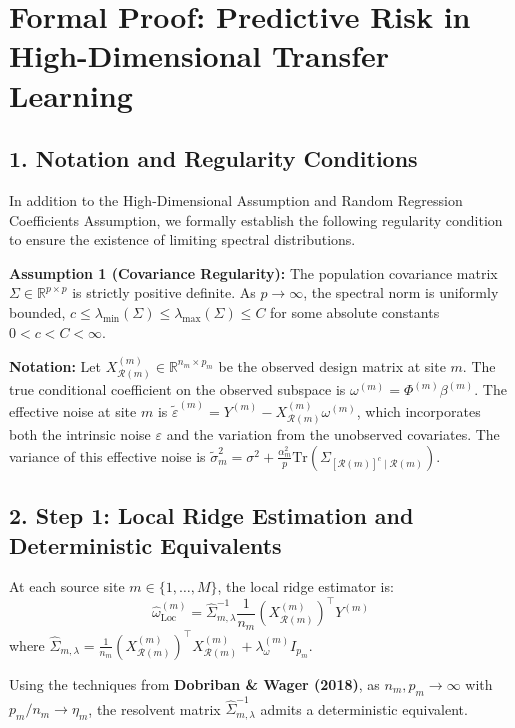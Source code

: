 \documentclass{article}
\begin{document}
\section*{Formal Proof: Predictive Risk in High-Dimensional Transfer Learning}

\subsection*{1. Notation and Regularity Conditions}

In addition to the High-Dimensional Assumption and Random Regression Coefficients Assumption, we formally establish the following regularity condition to ensure the existence of limiting spectral distributions.

\textbf{Assumption 1 (Covariance Regularity):} The population covariance matrix $\Sigma \in \mathbb{R}^{p \times p}$ is strictly positive definite. As $p \to \infty$, the spectral norm is uniformly bounded, $c \le \lambda_{\min}(\Sigma) \le \lambda_{\max}(\Sigma) \le C$ for some absolute constants $0 < c < C < \infty$.

\textbf{Notation:} Let $X_{\mathcal{R}(m)}^{(m)} \in \mathbb{R}^{n_m \times p_m}$ be the observed design matrix at site $m$. The true conditional coefficient on the observed subspace is $\omega^{(m)} = \Phi^{(m)} \beta^{(m)}$. The effective noise at site $m$ is $\tilde{\varepsilon}^{(m)} = Y^{(m)} - X_{\mathcal{R}(m)}^{(m)}\omega^{(m)}$, which incorporates both the intrinsic noise $\varepsilon$ and the variation from the unobserved covariates. The variance of this effective noise is $\tilde{\sigma}_m^2 = \sigma^2 + \frac{\alpha_m^2}{p} \mathrm{Tr}(\Sigma_{[\mathcal{R}(m)]^c \mid \mathcal{R}(m)})$.

\subsection*{2. Step 1: Local Ridge Estimation and Deterministic Equivalents}

At each source site $m \in \{1,\dots,M\}$, the local ridge estimator is:
\[
\widehat\omega^{(m)}_{\mathrm{Loc}} = \hat{\Sigma}_{m,\lambda}^{-1} \frac{1}{n_m} (X^{(m)}_{\mathcal{R}(m)})^\top Y^{(m)}
\]
where $\hat{\Sigma}_{m,\lambda} = \frac{1}{n_m} (X^{(m)}_{\mathcal{R}(m)})^\top X^{(m)}_{\mathcal{R}(m)} + \lambda_\omega^{(m)} I_{p_m}$.

Using the techniques from \textbf{Dobriban \& Wager (2018)}, as $n_m, p_m \to \infty$ with $p_m/n_m \to \eta_m$, the resolvent matrix $\hat{\Sigma}_{m,\lambda}^{-1}$ admits a deterministic equivalent. 
\end{document}
